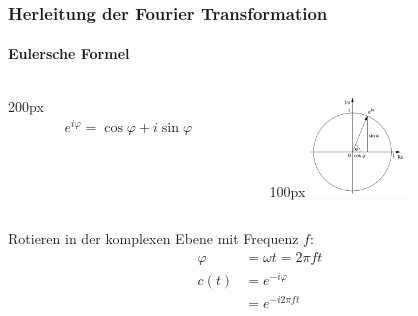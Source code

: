 \begin{frame}
    \frametitle{Herleitung der Fourier Transformation}
    \framesubtitle{Eulersche Formel}

    \hspace{-100px}
    \begin{columns}[c]
        \begin{column}{200px}
        \begin{align*}
        e^{i\varphi}=\cos{\varphi}+i\sin{\varphi}
    \end{align*}
\end{column}
\hspace*{-60px}
\begin{column}{100px}
    \includegraphics[width=100px]{images/02-deriving-fourier-euler.png}
\end{column}
    \end{columns}
    \vspace{20px}
    Rotieren in der komplexen Ebene mit Frequenz $f$: 
    \begin{align*}
        \varphi&=\omega t=2\pi ft \\
        c(t)&=e^{-i\varphi}\\
            &=e^{-i2\pi f t}
    \end{align*}
\end{frame}

